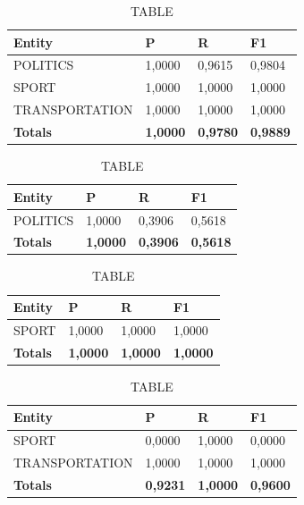 \documentclass[thesis=M,english]{FITthesis}[2018/05/30]
\begin{document}
	\begin{table}[H]\centering
		\caption{TABLE}
		\label{}
		\begin{tabular}{|l|l|l|l|}
			\hline {\textbf{Entity}} & {\textbf{P}} & {\textbf{R}} & {\textbf{F1}}\\\hline
				POLITICS & 1,0000 & 0,9615 & 0,9804\\
				SPORT & 1,0000 & 1,0000 & 1,0000\\
				TRANSPORTATION & 1,0000 & 1,0000 & 1,0000\\\hline
				\textbf{Totals} & \textbf{1,0000} & \textbf{0,9780} & \textbf{0,9889}\\\hline
		\end{tabular}
	\end{table}

	\begin{table}[H]\centering
		\caption{TABLE}
		\label{}
		\begin{tabular}{|l|l|l|l|}
			\hline {\textbf{Entity}} & {\textbf{P}} & {\textbf{R}} & {\textbf{F1}}\\\hline
				POLITICS & 1,0000 & 0,3906 & 0,5618\\\hline
				\textbf{Totals} & \textbf{1,0000} & \textbf{0,3906} & \textbf{0,5618}\\\hline
		\end{tabular}
	\end{table}

	\begin{table}[H]\centering
		\caption{TABLE}
		\label{}
		\begin{tabular}{|l|l|l|l|}
			\hline {\textbf{Entity}} & {\textbf{P}} & {\textbf{R}} & {\textbf{F1}}\\\hline
				SPORT & 1,0000 & 1,0000 & 1,0000\\\hline
				\textbf{Totals} & \textbf{1,0000} & \textbf{1,0000} & \textbf{1,0000}\\\hline
		\end{tabular}
	\end{table}	

	\begin{table}[H]\centering
		\caption{TABLE}
		\label{}
		\begin{tabular}{|l|l|l|l|}
			\hline {\textbf{Entity}} & {\textbf{P}} & {\textbf{R}} & {\textbf{F1}}\\\hline
				SPORT & 0,0000 & 1,0000 & 0,0000\\
				TRANSPORTATION & 1,0000 & 1,0000 & 1,0000\\\hline
				\textbf{Totals} & \textbf{0,9231} & \textbf{1,0000} & \textbf{0,9600}\\\hline
		\end{tabular}
	\end{table}	
	
\end{document}
